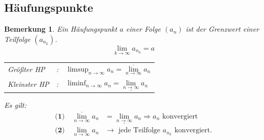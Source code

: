 \documentclass[12pt,a4paper]{article}%
\newtheorem{bem}{Bemerkung}[section]
\numberwithin{equation}{section}
\numberwithin{equation}{subsection}
\begin{document}
  \subsection{Häufungspunkte}
  \begin{bem}
    Ein Häufungspunkt $a$ einer Folge $(a_n)$ ist der Grenzwert einer Teilfolge $(a_{n_k})$.
    \begin{equation*}
      \lim\limits_{k \rightarrow \infty} a_{n_k} = a
    \end{equation*}
    \begin{tabular}{l c l}
      Größter HP&: & $\limsup_{n \rightarrow \infty} a_n = \overline{\lim\limits_{n \rightarrow \infty}} a_n$ \\
      Kleinster HP&: & $\liminf_{n \rightarrow \infty} a_n = \underline{\lim\limits_{n \rightarrow \infty}} a_n$
    \end{tabular} \newline
    Es gilt:
    \begin{align*}
    \textbf{(1)}\quad \overline{\lim\limits_{n \rightarrow \infty}} a_n &= \underline{\lim\limits_{n \rightarrow \infty}} a_n \Rightarrow a_n \text{ konvergiert} \\
    \textbf{(2)}\quad \lim\limits_{n \rightarrow \infty} a_n  &\rightarrow \text{ jede Teilfolge } a_{n_k} \text{ konvergiert.}
    \end{align*}
  \end{bem}  
  
\end{document}
